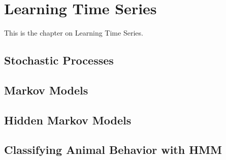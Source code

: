 \documentclass[main]{subfiles}
\begin{document}

\section{Learning Time Series}
This is the chapter on Learning Time Series.
\subsection{Stochastic Processes}
\subsection{Markov Models}
\subsection{Hidden Markov Models}
\subsection{Classifying Animal Behavior with HMM}
\end{document}
